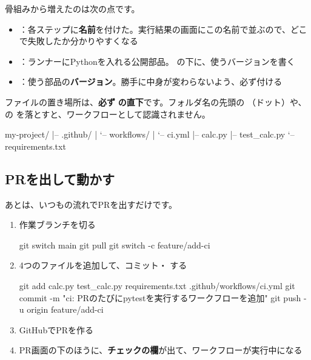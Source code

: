 骨組みから増えたのは次の点です。

\begin{itemize}[leftmargin=1.4em]
  \item {}：各ステップに\textbf{名前}を付けた。実行結果の画面にこの名前で並ぶので、どこで失敗したか分かりやすくなる
  \item {}：ランナーにPythonを入れる公開部品。 の下に、使うバージョンを書く
  \item {}：使う部品の\textbf{バージョン}。勝手に中身が変わらないよう、必ず付ける
\end{itemize}

ファイルの置き場所は、\textbf{必ず}  \textbf{の直下}です。フォルダ名の先頭の （ドット）や、 の  を落とすと、ワークフローとして認識されません。

\begin{codebox}[text]
\begin{code}
my-project/
|-- .github/
|   `-- workflows/
|       `-- ci.yml
|-- calc.py
|-- test_calc.py
`-- requirements.txt
\end{code}
\end{codebox}

\subsection{PRを出して動かす}

あとは、いつもの流れでPRを出すだけです。

\begin{enumerate}[leftmargin=1.6em]
  \item 作業ブランチを切る
\begin{codebox}[bash]
\begin{code}
git switch main
git pull
git switch -c feature/add-ci
\end{code}
\end{codebox}
  \item 4つのファイルを追加して、コミット・ する
\begin{codebox}[bash]
\begin{code}
git add calc.py test_calc.py requirements.txt .github/workflows/ci.yml
git commit -m "ci: PRのたびにpytestを実行するワークフローを追加"
git push -u origin feature/add-ci
\end{code}
\end{codebox}
  \item GitHubでPRを作る
  \item PR画面の下のほうに、\textbf{チェックの欄}が出て、ワークフローが実行中になる
\end{enumerate}

